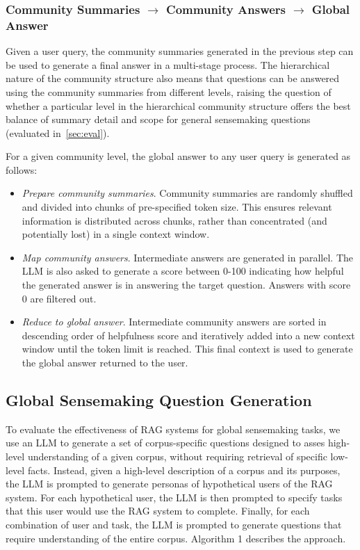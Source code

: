 \documentclass{article}
\begin{document}
\subsubsection{Community Summaries \texorpdfstring{$\rightarrow$}{-->} Community Answers \texorpdfstring{$\rightarrow$}{-->} Global Answer}
\label{sec:querytime}

Given a user query, the community summaries generated in the previous step can be used to generate a final answer in a multi-stage process.
The hierarchical nature of the community structure also means that questions can be answered using the community summaries from different levels, raising the question of whether a particular level in the hierarchical community structure offers the best balance of summary detail and scope for general sensemaking questions (evaluated in~\autoref{sec:eval}).

For a given community level, the global answer to any user query is generated as follows:  

\begin{itemize}
    \item \emph{Prepare community summaries}. Community summaries are randomly shuffled and divided into chunks of pre-specified token size.  This ensures relevant information is distributed across chunks, rather than concentrated (and potentially lost) in a single context window.
    \item \emph{Map community answers}. Intermediate answers are generated in parallel. The LLM is also asked to generate a score between 0-100 indicating how helpful the generated answer is in answering the target question. Answers with score 0 are filtered out.
    \item \emph{Reduce to global answer}. Intermediate community answers are sorted in descending order of helpfulness score and iteratively added into a new context window until the token limit is reached. This final context is used to generate the global answer returned to the user.
\end{itemize}

\subsection{Global Sensemaking Question Generation}
To evaluate the effectiveness of RAG systems for global sensemaking tasks, we use an LLM to generate a set of corpus-specific questions designed to asses high-level understanding of a given corpus, without requiring retrieval of specific low-level facts.
Instead, given a high-level description of a corpus and its purposes, the LLM is prompted to generate personas of hypothetical users of the RAG system.
For each hypothetical user, the LLM is then prompted to specify tasks that this user would use the RAG system to complete.
Finally, for each combination of user and task, the LLM is prompted to generate questions that require understanding of the entire corpus. Algorithm 1 describes the approach.
\end{document}
